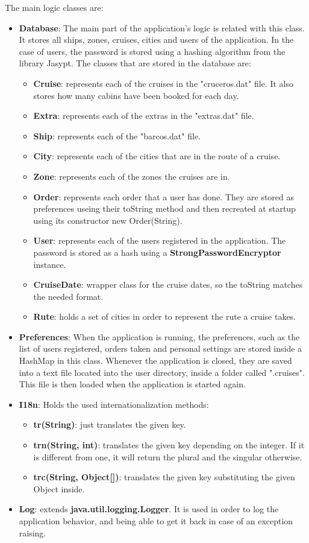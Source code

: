 \documentclass[11pt]{article}
\begin{document}
	The main logic classes are:
	\begin{itemize}
		\item \textbf{Database}: The main part of the application's logic is related with this class. It stores all ships, zones, cruises, cities and users of the application. In the case of users, the password is stored using a hashing algorithm from the library Jasypt. The classes that are stored in the database are:
		\begin{itemize}
			\item \textbf{Cruise}: represents each of the cruises in the "cruceros.dat" file. It also stores how many cabins have been booked for each day.
			\item \textbf{Extra}: represents each of the extras in the "extras.dat" file.
			\item \textbf{Ship}: represents each of the "barcos.dat" file.
			\item \textbf{City}: represents each of the cities that are in the route of a cruise.
			\item \textbf{Zone}: represents each of the zones the cruises are in.
			\item \textbf{Order}: represents each order that a user has done. They are stored as preferences useing their toString method and then recreated at startup using its constructor new Order(String).
			\item \textbf{User}: represents each of the users registered in the application. The password is stored as a hash using a \textbf{StrongPasswordEncryptor} instance.
			\item \textbf{CruiseDate}: wrapper class for the cruise dates, so the toString matches the needed format.
			\item \textbf{Rute}: holds a set of cities in order to represent the rute a cruise takes.
		\end{itemize}
		\item \textbf{Preferences}: When the application is running, the preferences, such as the list of users registered, orders taken and personal settings are stored inside a HashMap in this class. Whenever the application is closed, they are saved into a text file located into the user directory, inside a folder called ".cruises". This file is then loaded when the application is started again.
		\item \textbf{I18n}: Holds the used internationalization methods:
		\begin{itemize}
			\item \textbf{tr(String)}: just translates the given key.
			\item \textbf{trn(String, int)}: translates the given key depending on the integer. If it is different from one, it will return the plural and the singular otherwise.
			\item \textbf{trc(String, Object[])}: translates the given key substituting the given Object inside.
		\end{itemize}
		\item \textbf{Log}: extends \textbf{java.util.logging.Logger}. It is used in order to log the application behavior, and being able to get it back in case of an exception raising.
   \end{itemize}
\end{document}
